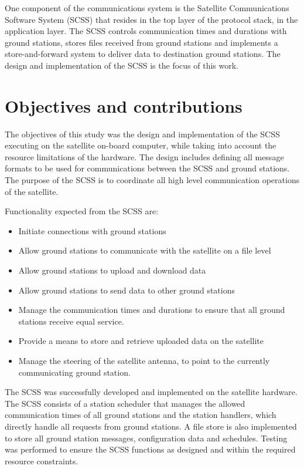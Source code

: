 One component of the communications system is the Satellite Communications Software System (SCSS) that
resides in the top layer of the protocol stack, in the application layer. The SCSS controls communication times
and durations with ground stations, stores files received from ground stations and implements a store-and-forward system
to deliver data to destination ground stations. The design and implementation of the SCSS is the focus
of this work.

\section{Objectives and contributions}
\label{objectives}

The objectives of this study was the design and implementation of the SCSS executing on the satellite
on-board computer, while taking into account the resource limitations of the hardware. The design
includes defining all message formats to be used for communications between the SCSS and ground stations.
The purpose of the SCSS is to coordinate all high level communication operations of the satellite.

Functionality expected from the SCSS are:
\begin{itemize}
\item Initiate connections with ground stations
\item Allow ground stations to communicate with the satellite on a file level
\item Allow ground stations to upload and download data
\item Allow ground stations to send data to other ground stations
\item Manage the communication times and durations to ensure that all ground stations receive equal service.
\item Provide a means to store and retrieve uploaded data on the satellite
\item Manage the steering of the satellite antenna, to point to the currently communicating ground station.
\end{itemize}

The SCSS was successfully developed and implemented on the satellite hardware. The SCSS
consists of a station scheduler that manages the allowed communication times of all ground stations and
the station handlers, which directly handle all requests from ground stations. A file store is also implemented
to store all ground station messages, configuration data and schedules. Testing was performed to ensure the
SCSS functions as designed and within the required resource constraints.

